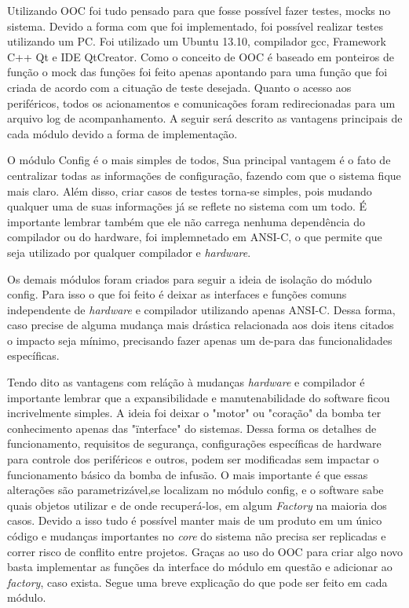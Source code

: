 Utilizando OOC foi tudo pensado para que fosse possível fazer testes, mocks no sistema. Devido a forma com que foi implementado, foi possível realizar testes utilizando um PC. Foi utilizado um Ubuntu 13.10, compilador gcc, Framework C++ Qt e IDE QtCreator. Como o conceito de OOC é baseado em ponteiros de função o mock das funções foi feito apenas apontando para uma função que foi criada de acordo com a cituação de teste desejada. Quanto o acesso aos periféricos, todos os acionamentos e comunicações foram redirecionadas para um arquivo log de acompanhamento. A seguir será descrito as vantagens principais de cada módulo devido a forma de implementação.

O módulo Config é o mais simples de todos, Sua principal vantagem é o fato de centralizar todas as informações de configuração, fazendo com que o sistema fique mais claro. Além disso, criar casos de testes torna-se simples, pois mudando qualquer uma de suas informações já se reflete no sistema com um todo. É importante lembrar também que ele não carrega nenhuma dependência do compilador ou do hardware, foi implemnetado em ANSI-C, o que permite que seja utilizado por qualquer compilador e \emph{hardware}.

Os demais módulos foram criados para seguir a ideia de isolação do módulo config. Para isso o que foi feito é deixar as interfaces e funções comuns independente de \emph{hardware} e compilador utilizando apenas ANSI-C. Dessa forma, caso precise de alguma mudança mais drástica relacionada aos dois itens citados o impacto seja mínimo, precisando fazer apenas um de-para das funcionalidades específicas. 

Tendo dito as vantagens com reláção à mudanças \emph{hardware} e compilador é importante lembrar que a expansibilidade e manutenabilidade do software ficou incrivelmente simples. A ideia foi deixar o "motor" ou "coração" da bomba ter conhecimento apenas das "ïnterface" do sistemas. Dessa forma os detalhes de funcionamento, requisitos de segurança, configurações específicas de hardware para controle dos periféricos e outros, podem ser modificadas sem impactar o funcionamento básico da bomba de infusão. O mais importante é que essas alterações são parametrizável,se localizam no módulo config, e o software sabe quais objetos utilizar e de onde recuperá-los, em algum \emph{Factory} na maioria dos casos. Devido a isso tudo é possível manter mais de um produto em um único código e mudanças importantes no \emph{core} do sistema não precisa ser replicadas e correr risco de conflito entre projetos. Graças ao uso do OOC para criar algo novo basta implementar as funções da interface do módulo em questão e adicionar ao \emph{factory}, caso exista. Segue uma breve explicação do que pode ser feito em cada módulo.

